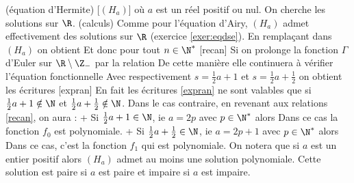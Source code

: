 \begin{exem}
\unite(équation d'Hermite)
[$(H_a)$]
où $a$ est un réel positif ou nul. On cherche les solutions \dse sur $\R$.
\mini(calculs)
Comme pour l'équation d'Airy, $(H_a)$ admet effectivement des solutions \dse sur $\R$ (exercice \ref{exer:eqdse}). En remplaçant dans $(H_a)$ on obtient
Et donc pour tout $n\in\N^*$
[recan]
Si on prolonge la fonction $\Gamma$ d'Euler sur $\R\setminus \Z_-$ par la relation
De cette manière elle continuera à vérifier l'équation fonctionnelle
Avec respectivement $s=\frac12a+1$ et $s=\frac12 a+\frac12$ on obtient les écritures
[expran]
En fait les écritures \eqref{expran} ne sont valables que si $\frac12a+1\notin\N$ et $\frac12a+\frac12\notin \N$. Dans le cas contraire, en revenant aux relations \eqref{recan}, on aura :
\xit+ Si $\frac12a+1\in\N$, ie $a=2p$ avec $p\in\N^*$ alors
Dans ce cas la fonction $f_0$ est polynomiale.
\xit+ Si $\frac12a+\frac12\in\N$, ie $a=2p+1$ avec $p\in\N^*$ alors
Dans ce cas,  c'est la fonction $f_1$ qui est polynomiale.
\xit On notera que si $a$ est un entier positif alors $(H_a)$ admet au moins une solution polynomiale. Cette solution est paire si $a$ est paire et impaire si $a$ est impaire.
\exit
\endmini


\end{exem}
